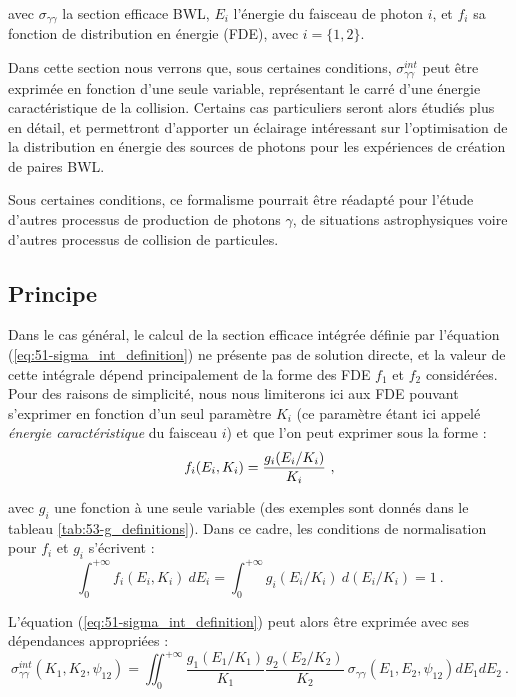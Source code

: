 \begin{refsection}
avec $\sigma_{\gamma\gamma}$ la section efficace BWL, $E_i$ l'énergie du faisceau de photon $i$, et $f_i$ sa fonction de distribution en énergie (FDE), avec $i=\{1,2\}$.

Dans cette section nous verrons que, sous certaines conditions, $\sigma_{\gamma\gamma}^{int}$ peut être exprimée en fonction d'une seule variable, représentant le carré d'une énergie caractéristique de la collision. Certains cas particuliers seront alors étudiés plus en détail, et permettront d'apporter un éclairage intéressant sur l'optimisation de la distribution en énergie des sources de photons pour les expériences de création de paires BWL.

Sous certaines conditions, ce formalisme pourrait être réadapté pour l'étude d'autres processus de production de photons $\gamma$, de situations astrophysiques voire d'autres processus de collision de particules. 

\subsection{Principe}

Dans le cas général, le calcul de la section efficace intégrée définie par l'équation (\ref{eq:51-sigma_int_definition}) ne présente pas de solution directe, et la valeur de cette intégrale dépend principalement de la forme des FDE $f_1$ et $f_2$ considérées. Pour des raisons de simplicité, nous nous limiterons ici aux FDE pouvant s'exprimer en fonction d'un seul paramètre $K_i$ (ce paramètre étant ici appelé \textit{énergie caractéristique} du faisceau $i$) et que l'on peut exprimer sous la forme :
\begin{equation}
    f_i(E_i, K_i) = \dfrac{g_i(E_i/K_i)}{K_i} ~ \rm ,
    \label{eq:53-g_definition}
\end{equation}

avec $g_i$ une fonction à une seule variable (des exemples sont donnés dans le tableau \ref{tab:53-g_definitions}). Dans ce cadre, les conditions de normalisation pour $f_i$ et $g_i$ s'écrivent :
\begin{equation}
    \int_0^{+\infty} f_i (E_i, K_i) ~ dE_i = \int_0^{+\infty} g_i (E_i/K_i) ~ d(E_i/K_i) = 1 ~ .
    \label{eq:53-g_normalisation}
\end{equation}

L'équation (\ref{eq:51-sigma_int_definition}) peut alors être exprimée avec ses dépendances appropriées :
\begin{equation}
\sigma_{\gamma\gamma}^{int}(K_1, K_2, \psi_{12}) = \iint_0^{+\infty} \dfrac{g_1(E_1/K_1)}{K_1} \dfrac{g_2(E_2/K_2)}{K_2} ~ \sigma_{\gamma\gamma}(E_1, E_2, \psi_{12}) dE_1 dE_2 ~ .
\label{eq:53-sigma_int_dependances}
\end{equation}


\end{refsection}

